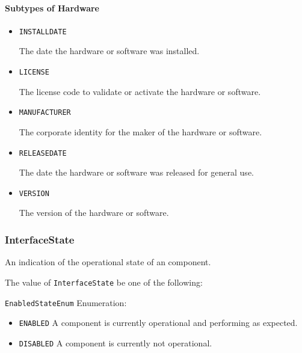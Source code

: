 \paragraph{Subtypes of Hardware}\mbox{}
\label{sec:Subtypes of Hardware}

\begin{itemize}

\item \texttt{INSTALL\textunderscore DATE}


The date the hardware or software was installed.

\item \texttt{LICENSE}


The license code to validate or activate the hardware or software.

\item \texttt{MANUFACTURER}


The corporate identity for the maker of the hardware or software.


\item \texttt{RELEASE\textunderscore DATE}


The date the hardware or software was released for general use.


\item \texttt{VERSION}


The version of the hardware or software.


\end{itemize}

\subsubsection{InterfaceState}




An indication of the operational state of an  component.


The value of \texttt{InterfaceState} \MUST be one of the following: 


\texttt{EnabledStateEnum} Enumeration:

\begin{itemize}
\item \texttt{ENABLED} \newline A component is currently operational and performing as expected. 
\item \texttt{DISABLED} \newline A component is currently not operational. 
\end{itemize}

\FloatBarrier

